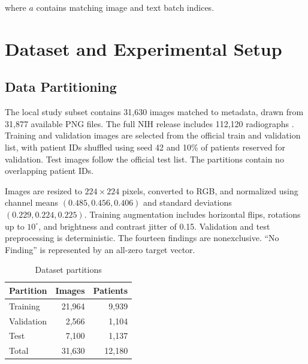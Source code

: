 \documentclass[runningheads,a4paper]{llncs}
\begin{document}
where $a$ contains matching image and text batch indices.

\section{Dataset and Experimental Setup}

\subsection{Data Partitioning}

The local study subset contains 31,630 images matched to metadata, drawn from 31,877 available PNG files. The full NIH release includes 112,120 radiographs \cite{nihdataset}. Training and validation images are selected from the official train and validation list, with patient IDs shuffled using seed 42 and 10\% of patients reserved for validation. Test images follow the official test list. The partitions contain no overlapping patient IDs.

Images are resized to $224\times224$ pixels, converted to RGB, and normalized using channel means $(0.485,0.456,0.406)$ and standard deviations $(0.229,0.224,0.225)$. Training augmentation includes horizontal flips, rotations up to $10^\circ$, and brightness and contrast jitter of 0.15. Validation and test preprocessing is deterministic. The fourteen findings are nonexclusive. ``No Finding'' is represented by an all-zero target vector.

\begin{table}[htbp]
\caption{Dataset partitions}
\label{tab:split}
\centering\small
\begin{tabular}{lrr}
\toprule
Partition & Images & Patients\\
\midrule
Training & 21,964 & 9,939\\
Validation & 2,566 & 1,104\\
Test & 7,100 & 1,137\\
\midrule
Total & 31,630 & 12,180\\
\bottomrule
\end{tabular}
\end{table}
\end{document}
